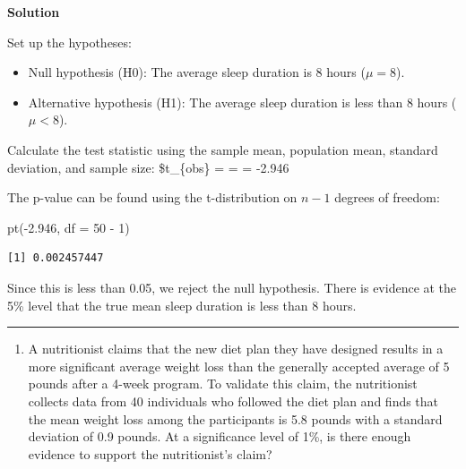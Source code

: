 \documentclass[
  letterpaper,
  DIV=11,
  numbers=noendperiod,
  oneside]{scrreprt}
\newenvironment{Shaded}{\begin{snugshade}}{\end{snugshade}}
\newcommand{\AttributeTok}[1]{\textcolor[rgb]{0.40,0.45,0.13}{#1}}
\newcommand{\DecValTok}[1]{\textcolor[rgb]{0.68,0.00,0.00}{#1}}
\newcommand{\FloatTok}[1]{\textcolor[rgb]{0.68,0.00,0.00}{#1}}
\newcommand{\FunctionTok}[1]{\textcolor[rgb]{0.28,0.35,0.67}{#1}}
\newcommand{\NormalTok}[1]{\textcolor[rgb]{0.00,0.23,0.31}{#1}}
\newcommand{\SpecialCharTok}[1]{\textcolor[rgb]{0.37,0.37,0.37}{#1}}
\providecommand{\tightlist}{%
  \setlength{\itemsep}{0pt}\setlength{\parskip}{0pt}}\usepackage{longtable,booktabs,array}
\begin{document}
\textbf{Solution}

Set up the hypotheses:

\begin{itemize}
\tightlist
\item
  Null hypothesis (H0\hspace{0pt}): The average sleep duration is 8
  hours (\(\mu = 8\)).
\item
  Alternative hypothesis (H1\hspace{0pt}): The average sleep duration is
  less than 8 hours (\(\mu < 8\)).
\end{itemize}

Calculate the test statistic using the sample mean, population mean,
standard deviation, and sample size: \$t\_\{obs\} =
 =  =
-2.946

The p-value can be found using the t-distribution on \(n-1\) degrees of
freedom:

\begin{Shaded}
\begin{Highlighting}[]
\FunctionTok{pt}\NormalTok{(}\SpecialCharTok{{-}}\FloatTok{2.946}\NormalTok{, }\AttributeTok{df =} \DecValTok{50} \SpecialCharTok{{-}} \DecValTok{1}\NormalTok{)}
\end{Highlighting}
\end{Shaded}

\begin{verbatim}
[1] 0.002457447
\end{verbatim}

Since this is less than 0.05, we reject the null hypothesis. There is
evidence at the 5\% level that the true mean sleep duration is less than
8 hours.

\begin{center}\rule{0.5\linewidth}{0.5pt}\end{center}

\begin{enumerate}
\def\labelenumi{\arabic{enumi}.}
\setcounter{enumi}{1}
\tightlist
\item
  A nutritionist claims that the new diet plan they have designed
  results in a more significant average weight loss than the generally
  accepted average of 5 pounds after a 4-week program. To validate this
  claim, the nutritionist collects data from 40 individuals who followed
  the diet plan and finds that the mean weight loss among the
  participants is 5.8 pounds with a standard deviation of 0.9 pounds. At
  a significance level of 1\%, is there enough evidence to support the
  nutritionist's claim?
\end{enumerate}
\end{document}

